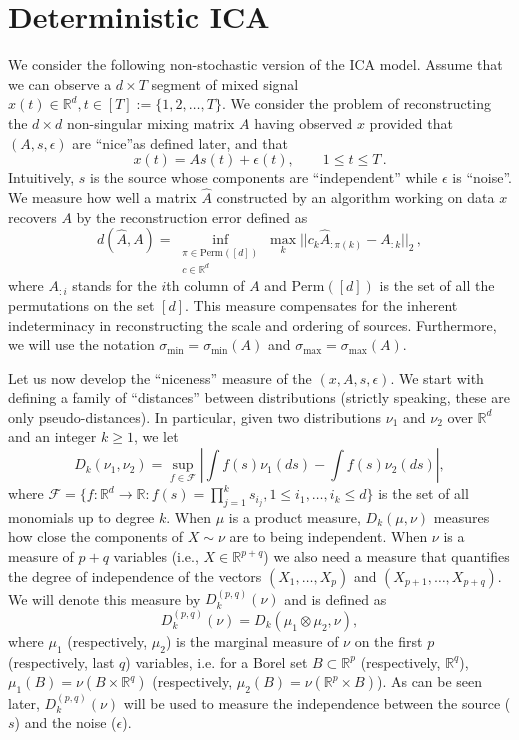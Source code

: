 \documentclass[11pt]{article}
\newcommand{\real}{\mathbb{R}}
\newcommand{\eps}{\epsilon}
\begin{document}
\section{Deterministic ICA}
\label{sec:ICAmain}
We consider the following non-stochastic version of the ICA model.
Assume that we can observe a $d\times T$ segment of mixed signal $x(t) \in \real^d, t \in [T]:=\{1,2,\ldots,T\}$.
We consider the problem of reconstructing the $d\times d$ non-singular mixing matrix $A$ having observed $x$ provided that $(A,s,\eps)$ are ``nice''as defined later, and that 
\begin{equation}
\label{eq:ICA}
x(t) = As(t)+\epsilon(t), \qquad 1\le t\le T\,.
\end{equation}
Intuitively, $s$ is the source whose components are ``independent'' while $\epsilon$ is ``noise''.
We measure how well a matrix $\hat{A}$ constructed by an algorithm working on data $x$ 
recovers $A$ by the reconstruction error defined as
\[
d(\hat{A}, A) = \inf_{
	\substack{\pi \in \mathrm{Perm}([d]) \\ c\in \real^d}} 
\max_{k} || c_k \hat{A}_{:\pi(k)} - A_{:k} ||_2\,,
\]
where $A_{:i}$ stands for the $i$th column of $A$ and
$\mathrm{Perm}([d])$ is the set of all the permutations on the set $[d]$.
This measure compensates for the inherent indeterminacy in reconstructing the scale and ordering of sources.
Furthermore, we will use the notation $\sigma_{\min}=\sigma_{\min}(A)$ and
$\sigma_{\max}=\sigma_{\max}(A)$.

Let us now develop the ``niceness'' measure of the $(x,A,s,\eps)$. 
We start with defining a family of ``distances'' between distributions (strictly speaking, these are only pseudo-distances).
In particular, given two distributions $\nu_1$ and $\nu_2$ over $\real^d$ and an integer $k\ge 1$, we
let 
$$D_k(\nu_1,\nu_2) = \sup_{f\in\mathcal{F}} |\int f(s)\nu_1(ds) - \int f(s)\nu_2(ds)|,$$ 
where $\mathcal{F}=\{f:\real^d \to \real : f(s)=\prod_{j=1}^k s_{i_j}, 1 \le i_1,\ldots,i_k \le d\}$ 
is the set of all monomials up to degree $k$.
When $\mu$ is a product measure, $D_k(\mu,\nu)$ measures how close the components of $X\sim \nu$ are to being independent.
When $\nu$ is a measure of $p+q$ variables (i.e., $X\in \real^{p+q}$) 
we also need a measure that quantifies the degree of independence of the vectors $(X_1,\dots,X_p)$ and $(X_{p+1},\dots,X_{p+q})$. We will denote this measure by $D_k^{(p,q)}(\nu)$ and is defined as 
$$D_k^{(p,q)} (\nu)= D_k(\mu_1\otimes \mu_2,\nu),$$
where $\mu_1$ (respectively, $\mu_2$) is the marginal measure of $\nu$ on the first $p$ (respectively, last $q$) variables, i.e. for a Borel set $B\subset \real^p$ (respectively, $\real^q$), $\mu_1(B) = \nu(B\times \real^q)$ (respectively, $\mu_2(B) = \nu(\real^p \times B)$).
As can be seen later, $D_k^{(p,q)}(\nu)$ will be used to measure the independence between the source ($s$) and the noise ($\eps$).
\end{document}
